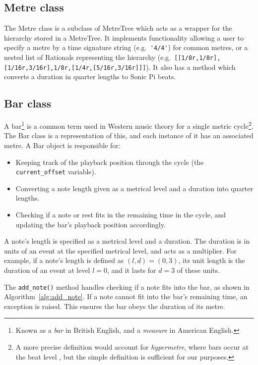 \documentclass[12pt,twoside,openright]{report}
\begin{document}
\subsection{Metre class} \label{metre_class}

The Metre class is a subclass of MetreTree which acts as a wrapper for the
hierarchy stored in a MetreTree. It implements functionality allowing a user to
specify a metre by a time signature string (e.g.\ \verb|'4/4'|) for common metres, or a
nested list of Rationals representing the hierarchy (e.g.\ \verb'[[1/8r,1/8r],[1/16r,3/16r],1/8r,[1/4r,[5/16r,3/16r]]]'). It also has a method which
converts a duration in quarter lengths to Sonic
Pi beats.


\subsection{Bar class} \label{bar_class}

A bar\footnote{Known as a \emph{bar} in British English, and a \emph{measure} in American English.} is a common term used in Western music theory for a single
metric cycle\footnote{A more precise definition would account for \emph{hypermetre}, where bars occur at the beat level \cite{neal2000}, but the simple definition is sufficient for our purposes.}. The Bar class is a representation of this, and each instance of it
has an associated metre. A Bar object is responsible for:
\begin{itemize}
	\item Keeping track of the playback position through the cycle (the \verb'current_offset' variable).
	\item Converting a note length given as a metrical level and a duration into
quarter lengths.
	\item Checking if a note or rest fits in the remaining time in the cycle, and
updating the bar's playback position accordingly.
\end{itemize}

A note's length is specified as a metrical level and a duration. The duration
is in units of an event at the specified metrical level, and acts as a multiplier.
For example, if a note's length is defined as $(l,d)=(0,3)$, its unit length is the duration of an event at level $l=0$, and it lasts for $d=3$ of these units.

The \verb'add_note()' method handles checking if a note fits into the bar, as shown in
Algorithm~\ref{alg:add_note}. If a note cannot fit into the bar's remaining time,
an exception is raised. This ensures the bar obeys the duration of its metre.
\end{document}
